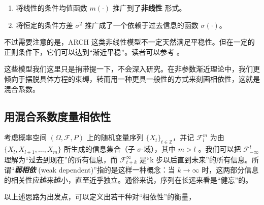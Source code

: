 \begin{enumerate}
\def\labelenumi{\arabic{enumi}.}
\tightlist
\item
  将线性的条件均值函数 $m(\cdot)$ 推广到了\textbf{非线性} 形式。
\item
  将恒定的条件方差 $\sigma^2$ 推广成了一个依赖于过去信息的函数 $\sigma(\cdot)$。
\end{enumerate}

不过需要注意的是，ARCH 这类非线性模型不一定天然满足平稳性。但在一定的正则条件下，它们可以达到``渐近平稳''。读者可以参考 \cite{gourieroux2012}。

这些模型我们这里只是捎带提一下，不会深入研究。在非参数渐近理论中，我们更倾向于摆脱具体方程的束缚，转而用一种更具一般性的方式来刻画相依性，这就是混合系数。

\subsection{用混合系数度量相依性}

考虑概率空间 $(\Omega,\mathcal F,P)$ 上的随机变量序列 $\{X_t\}_{t\in\mathbb Z}$，并记 $\mathcal{F}_{l}^{m}$ 为由 $\{X_l, X_{l+1}, \dots, X_m\}$ 所生成的信息集合（子 $\sigma$-域），其中 $m>l$ 。我们可以把 $\mathcal{F}_{-\infty}^{t}$ 理解为``过去到现在''的所有信息，而 $\mathcal{F}_{t+k}^{\infty}$ 是``k 步以后直到未来''的所有信息。所谓``\textbf{\emph{弱相依}} (weak dependent)''指的是这样一种概念：当 $k \to \infty$ 时，这两部分信息的相关性应越来越小，直至近乎独立。通俗来说，序列在长远来看是``健忘''的。

以上述思路为出发点，可以定义出若干种对``相依性''的衡量，

